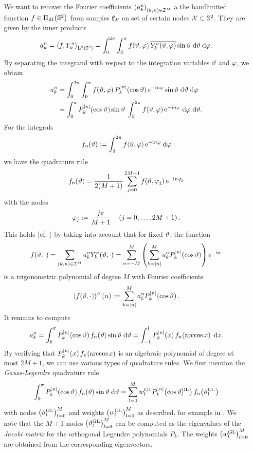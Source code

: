 We want to recover the Fourier coefficients $\left(a_{k}^n\right)_{(k,n) \in \mathcal{I}^M}$ a the bandlimited function $f \in \Pi_{M}{\hspace{-0.4ex}}\left(\mathbb{S}^2\right)$
from samples $\mathbf{f}_{\mathcal{X}}$ on set of certain nodes $\mathcal{X} 
\subset \mathbb{S}^2$. They are given by the inner products
\[
  a_{k}^n = \left<f,Y_{k}^n\right>_{\text{\rm{L}}^{2}\left(\mathbb{S}^2\right)} = \int_{0}^{2\pi} \int_{0}^{\pi} 
  f{\hspace{-0.4ex}}\left(\vartheta,\varphi\right) \overline{Y_{k}^n{\hspace{-0.4ex}}\left(\vartheta,\varphi\right)} \sin \vartheta 
  \; \text{\rm{d}} \vartheta \; \text{\rm{d}} \varphi.
\]
By separating the integrand with respect to the integration variables $\vartheta$ and $\varphi$, we obtain
\begin{align*}
  a_{k}^n & = \int_{0}^{2\pi} \int_{0}^{\pi} f{\hspace{-0.4ex}}\left(\vartheta,\varphi\right) P_{k}^{\left\vert n\right\vert}{\hspace{-0.4ex}}\left(\cos \vartheta\right) \mbox{\rm{e}}^{-\mbox{\scriptsize\rm{i}} n \varphi} \sin \vartheta \; \text{\rm{d}} \vartheta \; \text{\rm{d}} \varphi\\
          & = \int_{0}^{\pi} P_{k}^{\left\vert n\right\vert}{\hspace{-0.4ex}}\left(\cos \vartheta\right) \sin \vartheta \; \int_{0}^{2\pi} f{\hspace{-0.4ex}}\left(\vartheta,\varphi\right) \mbox{\rm{e}}^{-\mbox{\scriptsize\rm{i}} n \varphi} \; \text{\rm{d}} \varphi \; \text{\rm{d}} \vartheta.
\end{align*}
For the integrals
\[
  f_{n}{\hspace{-0.4ex}}\left(\vartheta\right) := \int_{0}^{2\pi} f{\hspace{-0.4ex}}\left(\vartheta,\varphi\right) \mbox{\rm{e}}^{-\mbox{\scriptsize\rm{i}} n \varphi} \; \text{\rm{d}} \varphi
\]
we have the quadrature rule
\[ 
  f_{n}{\hspace{-0.4ex}}\left(\vartheta\right) = \frac{1}{2(M+1)} \sum_{j=0}^{2M+1} f{\hspace{-0.4ex}}\left(\vartheta,\varphi_{j}\right) \mbox{\rm{e}}^{-\mbox{\scriptsize\rm{i}} n \varphi_{j}}
\]
with the nodes
\[ 
  \varphi_{j} := \frac{j\pi}{M+1} \quad \left(j=0,\ldots,2M+1\right). 
\]
This holds (cf. \cite[Chapter X]{Zy}) by taking into account that for fixed $\vartheta$, the function
\[
  f{\hspace{-0.4ex}}\left(\vartheta,\cdot\right) = \sum_{(k,n) \in \mathcal{I}^M} a_{k}^n
  Y_{k}^n{\hspace{-0.4ex}}\left(\vartheta,\cdot\right) = \sum_{n=-M}^{M} 
  \left(\sum_{k=\left\vert n\right\vert}^M a_{k}^n 
  P_{k}^{\left\vert n\right\vert}{\hspace{-0.4ex}}\left(\cos \vartheta\right)\right) \mbox{\rm{e}}^{-\mbox{\scriptsize\rm{i}} n \cdot}
\]
is a trigonometric polynomial of degree $M$ with Fourier coefficients
\[
  \left(f{\hspace{-0.4ex}}\left(\vartheta,\cdot\right)\right)^{\wedge}{\hspace{-0.4ex}}\left(n\right) := \sum_{k=\left\vert n\right\vert}^M a_{k}^n P_{k}^{\left\vert n\right\vert}{\hspace{-0.4ex}}\left(\cos \vartheta\right).
\]
It remains to compute
\[
  a_{k}^n = \int_{0}^{\pi} P_{k}^{\left\vert n\right\vert}{\hspace{-0.4ex}}\left(\cos \vartheta\right) f_{n}{\hspace{-0.4ex}}\left(\vartheta\right) \sin \vartheta \; \text{\rm{d}} \vartheta = 
  \int_{-1}^1 P_{k}^{\left\vert n\right\vert}{\hspace{-0.4ex}}\left(x\right) f_{n}{\hspace{-0.4ex}}\left(\arccos x\right) \; \text{\rm{d}} x.
\]
By verifying that $P_{k}^{\left\vert n\right\vert}{\hspace{-0.4ex}}\left(x\right) f_{n}{\hspace{-0.4ex}}\left(\arccos x\right)$ is an algebraic polynomial of degree at most $2M+1$, 
we can use various types of quadrature rules. We first mention the \emph{Gauss-Legendre} quadrature rule
\[
  \int_{0}^{\pi} P_{k}^{\left\vert n\right\vert}{\hspace{-0.4ex}}\left(\cos \vartheta\right) f_{n}{\hspace{-0.4ex}}\left(\vartheta\right) \sin \vartheta \; \text{\rm{d}} \vartheta = \sum_{l=0}^{M} w_{l}^{\mbox{\scriptsize\rm{GL}}} P_{k}^{\left\vert n\right\vert}{\hspace{-0.4ex}}\left(\cos \vartheta_{l}^{\mbox{\scriptsize\rm{GL}}}\right) f_{n}{\hspace{-0.4ex}}\left(\vartheta_{l}^{\mbox{\scriptsize\rm{GL}}}\right) 
\]
with nodes $\left(\vartheta_{l}^{\mbox{\scriptsize\rm{GL}}}\right)_{l=0}^M$ and weights $\left(w_{l}^{\mbox{\scriptsize\rm{GL}}}\right)_{l=0}^M$ as described, for example in \cite{boehme02}. 
We note that the $M+1$ nodes $\left(\vartheta_{l}^{\mbox{\scriptsize\rm{GL}}}\right)_{l=0}^{M}$ can be computed as the eigenvalues of the \emph{Jacobi matrix} for the orthogonal 
Legendre polynomials $P_{k}$. The weights $\left(w_{l}^{\mbox{\scriptsize\rm{GL}}}\right)_{l=0}^{M}$ are obtained from the corresponding eigenvectors.

